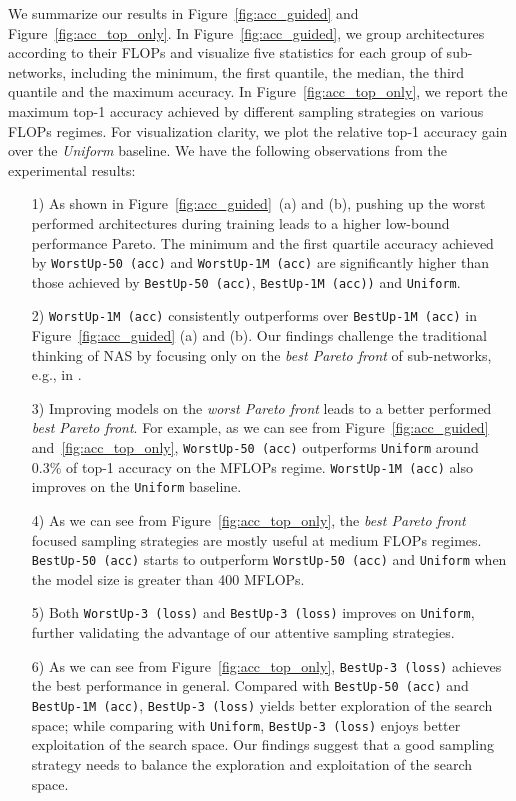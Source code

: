 \documentclass[final]{cvpr}
\theoremstyle{definition}
\begin{document}
We summarize our results in Figure~\ref{fig:acc_guided} and Figure~\ref{fig:acc_top_only}. 
In Figure~\ref{fig:acc_guided}, 
we group architectures according to their FLOPs 
and visualize five statistics for each group of sub-networks, including the minimum, the first quantile, the median, the third quantile and the maximum accuracy.
In Figure~\ref{fig:acc_top_only},
we report the maximum top-1 accuracy achieved by different sampling strategies on various FLOPs regimes. 
For visualization clarity, we plot the relative top-1 accuracy gain over the \textit{Uniform} baseline. 
We have the following observations from the experimental results:
\begin{itemize}
    \item[1)] As shown in Figure~\ref{fig:acc_guided}~(a) and (b),
    pushing up the worst performed architectures
    during training leads to a higher low-bound performance Pareto. 
    The minimum and the first quartile accuracy achieved by  \texttt{WorstUp-50 (acc)} and \texttt{WorstUp-1M (acc)} are significantly higher than those achieved by \texttt{BestUp-50 (acc)}, \texttt{BestUp-1M (acc))} and \texttt{Uniform}. 
    \item[2)] \texttt{WorstUp-1M (acc)} consistently outperforms over \texttt{BestUp-1M (acc)} in Figure~\ref{fig:acc_guided} (a) and (b). Our findings challenge the traditional thinking of NAS by focusing only on the \emph{best Pareto front} of sub-networks, e.g., in \cite{liu2018darts, cai2018proxylessnas}.
\item[3)] Improving models on the \emph{worst Pareto front} leads to a better performed \emph{best Pareto front}.  For example, as we can see from Figure~\ref{fig:acc_guided} and~\ref{fig:acc_top_only}, \texttt{WorstUp-50 (acc)} outperforms \texttt{Uniform} around 0.3\% of top-1 accuracy on the  MFLOPs regime. \texttt{WorstUp-1M (acc)} also improves on the \texttt{Uniform} baseline. 
    \item[4)] As we can see from Figure~\ref{fig:acc_top_only}, the \emph{best Pareto front} focused sampling strategies are mostly useful at medium FLOPs regimes. \texttt{BestUp-50 (acc)} starts to outperform \texttt{WorstUp-50 (acc)}  and \texttt{Uniform} when the model size is greater than 400 MFLOPs. 
    \item[5)] Both \texttt{WorstUp-3 (loss)} and \texttt{BestUp-3 (loss)} improves on \texttt{Uniform}, further validating the advantage of our attentive sampling strategies. 
    \item[6)] As we can see from Figure~\ref{fig:acc_top_only}, \texttt{BestUp-3 (loss)} achieves the best performance in general. Compared with \texttt{BestUp-50 (acc)} and \texttt{BestUp-1M (acc)}, \texttt{BestUp-3 (loss)} yields better exploration of the search space; while comparing with \texttt{Uniform}, \texttt{BestUp-3 (loss)} enjoys better exploitation of the search space. Our findings suggest that a good sampling strategy needs to balance the exploration  and exploitation of the search space.  
\end{itemize}
 
\end{document}
